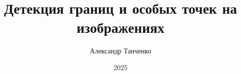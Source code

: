 \documentclass[12pt,usepdftitle=false,aspectratio=1610]{beamer}
\title[Лекция 6]{Детекция границ и особых точек на изображениях}
\author{Александр Танченко}
\institute{}
\date{2025}
\begin{document}
\begin{frame}
    \titlepage
\end{frame}
\end{document}
